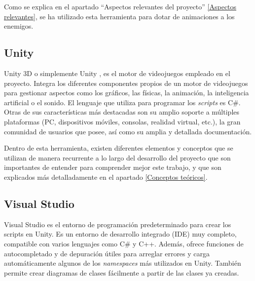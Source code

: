 Como se explica en el apartado “Aspectos relevantes del proyecto” \ref{Aspectos relevantes}, se ha utilizado esta herramienta para dotar de animaciones a los enemigos.

\subsection{Unity}
Unity 3D o simplemente Unity \cite{wiki:Unity}, es el motor de videojuegos empleado en el proyecto. Integra los diferentes componentes propios de un motor de videojuegos para gestionar aspectos como los gráficos, las físicas, la animación, la inteligencia artificial o el sonido. El lenguaje que utiliza para programar los \textit{scripts} es C\#.\\
Otras de sus características más destacadas son su amplio soporte a múltiples plataformas (PC, dispositivos móviles, consolas, realidad virtual, etc.), la gran comunidad de usuarios que posee, así como su amplia y detallada documentación.

Dentro de esta herramienta, existen diferentes elementos y conceptos que se utilizan de manera recurrente a lo largo del desarrollo del proyecto que son importantes de entender para comprender mejor este trabajo, y que son explicados más detalladamente en el apartado \ref{Conceptos teóricos}.

\subsection{Visual Studio}
Visual Studio \cite{wiki:VisualStudio} es el entorno de programación predeterminado para crear los scripts en Unity. Es un entorno de desarrollo integrado (IDE) muy completo, compatible con varios lenguajes como C\# y C++. Además, ofrece funciones de autocompletado y de depuración útiles para arreglar errores y carga automáticamente algunos de los \textit{namespaces} más utilizados en Unity. También permite crear diagramas de clases fácilmente a partir de las clases ya creadas.